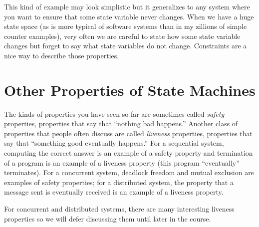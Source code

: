 This kind of example may look simplistic but it generalizes
to any system where you want to ensure that some state
variable never changes.  When we have a huge state
space (as is more typical of software systems
than in my zillions of simple counter examples),
very often we are careful to state how some state
variable changes but forget to say what state
variables do not change.  Constraints are a nice way
to describe those properties.

\section{Other Properties of State Machines}

The kinds of properties you have seen so far are sometimes called {\em
safety} properties, properties that say that ``nothing bad
happens.''  Another class of properties that people often discuss are
called {\em liveness} properties, properties that say that
``something good eventually happens.''  For a sequential system,
computing the correct answer is an example of a safety property and
termination of a program is an example of a liveness property (this
program ``eventually'' terminates).  For a concurrent system, deadlock
freedom and mutual exclusion are examples of safety properties; for a
distributed system, the property that a message sent is eventually
received is an example of a liveness property.

For concurrent and distributed systems, there are many interesting
liveness properties so we will defer discussing them until later
in the course.













